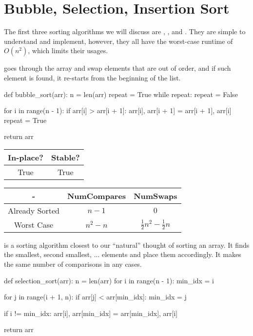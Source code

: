 \section{Bubble, Selection, Insertion Sort}

The first three sorting algorithms we will discuss are , , and . They are simple to understand and implement, however, they all have the worst-case runtime of $O(n^{2})$, which limits their usages.

 goes through the array and swap elements that are out of order, and if such element is found, it re-starts from the beginning of the list.

\begin{python}
def bubble_sort(arr):
    n = len(arr)
    repeat = True
    while repeat:
        repeat = False

        for i in range(n - 1):
            if arr[i] > arr[i + 1]:
                arr[i], arr[i + 1] = arr[i + 1], arr[i]
                repeat = True

    return arr
\end{python}

\begin{center}
  \begin{tabular}{ | c | c | }
    \hline
    In-place? & Stable? \\
    \hline
    True & True \\
    \hline
  \end{tabular}
\end{center}

\begin{center}
  \begin{tabular}{ | c | c | c | }
    \hline
    - & NumCompares & NumSwaps \\
    \hline
    Already Sorted & $n - 1$ & $0$ \\
    \hline
    Worst Case & $n^{2} - n$ & $\frac{1}{2} n^{2} - \frac{1}{2} n$ \\
    \hline
  \end{tabular}
\end{center}

 is a sorting algorithm closest to our ``natural'' thought of sorting an array. It finds the smallest, second smallest, ... elements and place them accordingly. It makes the same number of comparisons in any cases.

\begin{python}
def selection_sort(arr):
    n = len(arr)
    for i in range(n - 1):
        min_idx = i

        for j in range(i + 1, n):
            if arr[j] < arr[min_idx]:
                min_idx = j

        if i != min_idx:
            arr[i], arr[min_idx] = arr[min_idx], arr[i]

    return arr
\end{python}

